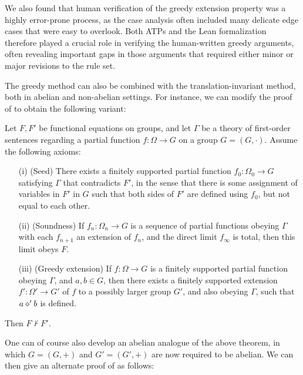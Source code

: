 We also found that human verification of the greedy extension property was a highly error-prone process, as the case analysis often included many delicate edge cases that were easy to overlook.  Both ATPs and the Lean formalization therefore played a crucial role in verifying the human-written greedy arguments, often revealing important gaps in those arguments that required either minor or major revisions to the rule set.

The greedy method can also be combined with the translation-invariant method, both in abelian and non-abelian settings. For instance, we can modify the proof of  to obtain the following variant:

\begin{theorem}\label{nc-greedy-abstract} Let $F,F'$ be functional equations on groups, and let $\Gamma$ be a theory of first-order sentences regarding a partial function $f \colon \Omega \to G$ on a group $G = (G,\cdot)$.  Assume the following axioms:
  \begin{itemize}
    \item[(i)] (Seed) There exists a finitely supported partial function $f_0 \colon \Omega_0 \to G$ satisfying $\Gamma$ that contradicts $F'$, in the sense that there is some assignment of variables in $F'$ in $G$ such that both sides of $F'$ are defined using $f_0$, but not equal to each other.
    \item[(ii)]  (Soundness)  If $f_n \colon \Omega_n \to G$ is a sequence of partial functions obeying $\Gamma$ with each $f_{n+1}$ an extension of $f_n$, and the direct limit $f_\infty$ is total, then this limit obeys $F$.
    \item[(iii)] (Greedy extension)  If $f \colon \Omega \to G$ is a finitely supported partial function obeying $\Gamma$, and $a,b \in G$, then there exists a finitely supported extension $f' \colon \Omega' \to G'$ of $f$ to a possibly larger group $G'$, and also obeying $\Gamma$, such that $a \diamond' b$ is defined.
  \end{itemize}
  Then $F \nvdash F'$.
\end{theorem}

One can of course also develop an abelian analogue of the above theorem, in which $G = (G,+)$ and $G' = (G',+)$ are now required to be abelian.  We can then give an alternate proof of  as follows:

